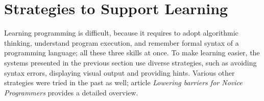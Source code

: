 %




\section{Strategies to Support Learning}
\label{sec:strategies-for-easier-learning}

Learning programming is difficult,
  because it requires
  to adopt algorithmic thinking,
  understand program execution,
  and remember formal syntax of a programming language;
  all these three skills at once. %
To make learning easier,
  the systems presented in the previous section use diverse strategies,
  such as avoiding syntax errors,
  displaying visual output
  and providing hints.
Various other strategies were tried in the past as well;
article \emph{Lowering barriers for Novice Programmers}
  \cite{lowering-barriers}
  provides a detailed overview.


